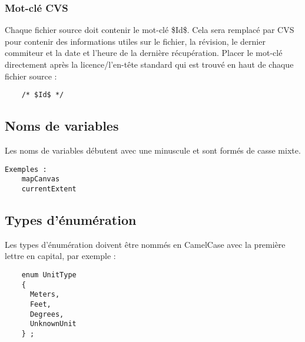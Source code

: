 \subsubsection{Mot-cl\'e CVS}
Chaque fichier source doit contenir le mot-cl\'e \$Id\$. Cela sera remplac\'e par CVS pour contenir des informations utiles sur le fichier, la r\'evision, le dernier commiteur et la date et l'heure de la derni\`ere r\'ecup\'eration. 
Placer le mot-cl\'e directement apr\`es la licence/l'en-t\^ete standard qui est trouv\'e en haut de chaque fichier source :
\begin{verbatim}
	/* $Id$ */
\end{verbatim}

\subsection{Noms de variables}
Les noms de variables d\'ebutent avec une minuscule et sont form\'es de casse mixte.
\begin{verbatim}
Exemples :
	mapCanvas
	currentExtent
\end{verbatim}
\subsection{Types d'\'enum\'eration}
Les types d'\'enum\'eration doivent \^etre nomm\'es en CamelCase avec la premi\`ere lettre en capital, par exemple :
\begin{verbatim}
    enum UnitType
    {
      Meters,
      Feet,
      Degrees,
      UnknownUnit
    } ;
\end{verbatim}

